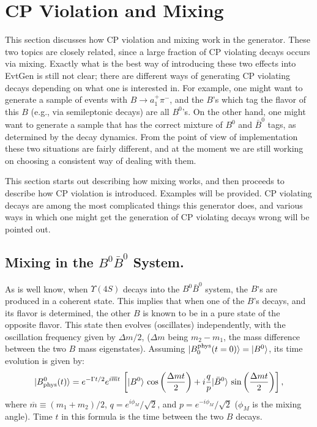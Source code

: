 

\section{CP Violation and Mixing}
\label{sect:cpviolation}

This section discusses how CP violation and mixing work
in the generator. These two topics are closely related, since
a large fraction of CP violating decays occurs via mixing. Exactly what is 
the best way of introducing these two effects into EvtGen is still not clear; 
there are different ways of generating CP violating decays depending on what 
one is interested in.  For example, one might want to generate a sample of events with 
$B\rightarrow a_1^+ \pi^-$, and the $B$'s which tag the flavor of this $B$ 
(e.g., via semileptonic decays) are all $B^0$'s.  On the
other hand, one might want to generate a sample that has the 
correct mixture of $B^0$ and $\bar B^0$ tags, as determined by the decay 
dynamics.  From the point of view of implementation these two situations are 
fairly different, and at the moment we are still working on choosing 
a consistent way of dealing with them.

This section starts out describing how mixing works, and
then proceeds to describe how CP violation is introduced.  Examples
will be provided. CP violating decays are
among the most complicated things this generator does, and 
various ways in which one might get the generation of CP
violating decays wrong will be pointed out.

\subsection{Mixing in the $B^0\bar B^0$ System.}

As is well know, when $\Upsilon(4S)$ decays into the $B^0\bar B^0$ system, 
the $B$'s are produced in a coherent state.  This implies that  
when one of the $B$'s decays, and its flavor is determined, the other
$B$ is known to be in a pure state of the opposite flavor.
This state then evolves (oscillates) independently, with the oscillation frequency
given by $\Delta m /2$, ($\Delta m$ being $m_{2} - m_{1}$, the mass difference between the two $B$ mass 
eigenstates).  Assuming $|B_{0}^{\rm phys}(t = 0)\rangle = |B^{0}\rangle$, its time evolution is given by: 
\begin{equation}
|B_{\rm phys}^{0}(t)\rangle = e^{-\Gamma t/2}e^{i\overline{m} t}\,\left[ |B^0\rangle\,\cos\left(\frac{\Delta m t}{2}\right) + i\frac{q}{p}|\bar B^0\rangle\,\sin\left(\frac{\Delta m t}{2}\right)\right],
\end{equation}
where $\overline{m} \equiv (m_{1} + m_{2})/2$, $q = e^{i\phi_{M}}/\sqrt{2}$, and $p = e^{-i\phi_{M}}/\sqrt{2}$ ($\phi_{M}$ is the mixing angle).  Time $t$ in this formula is the time between the two $B$ decays.

